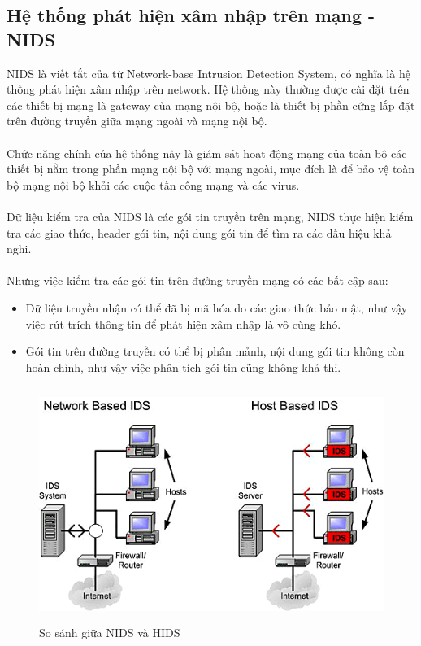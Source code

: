 \subsection{Hệ thống phát hiện xâm nhập trên mạng - NIDS}
  NIDS là viết tắt của từ Network-base Intrusion Detection System, có nghĩa là
  hệ thống phát hiện xâm nhập trên network. Hệ thống này thường được cài đặt
  trên các thiết bị mạng là gateway của mạng nội bộ, hoặc là thiết bị phần cứng
  lắp đặt trên đường truyền giữa mạng ngoài và mạng nội bộ.\\\\ 
   Chức năng chính của hệ thống này là giám sát hoạt động mạng của toàn bộ các
   thiết bị nằm trong phần mạng nội bộ với mạng ngoài, mục đích là để bảo vệ
   toàn bộ mạng nội bộ khỏi các cuộc tấn công mạng và các virus.\\\\ 
    Dữ liệu kiểm tra của NIDS là các gói tin truyền trên mạng, NIDS thực hiện
    kiểm tra các giao thức, header gói tin, nội dung gói tin để tìm ra các dấu
    hiệu khả nghi. \\\\ 
    Nhưng việc kiểm tra các gói tin trên đường truyền
    mạng có các bất cập sau:
    \begin{itemize}
      \item Dữ liệu truyền nhận có thể đã bị mã hóa do các giao thức bảo mật,
      như vậy việc rút trích thông tin để phát hiện xâm nhập là vô cùng khó.
      \item Gói tin trên đường truyền có thể bị phân mảnh, nội dung gói tin
      không còn hoàn chỉnh, như vậy việc phân tích gói tin cũng không khả thi.
    \end{itemize}
    \begin{figure}[h!]
	\centering 
	\includegraphics[width=6in,height=3in,keepaspectratio=true]{HIDS_NIDS.png}
	\caption{So sánh giữa NIDS và HIDS}
\end{figure}
